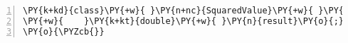 \begin{Verbatim}[commandchars=\\\{\},numbers=left,firstnumber=1,stepnumber=1,frame=single,fontsize=\small]
\PY{k+kd}{class}\PY{+w}{ }\PY{n+nc}{SquaredValue}\PY{+w}{ }\PY{o}{\PYZob{}}
\PY{+w}{    }\PY{k+kt}{double}\PY{+w}{ }\PY{n}{result}\PY{o}{;}
\PY{o}{\PYZcb{}}
\end{Verbatim}
